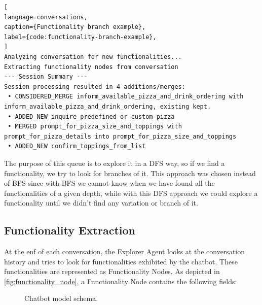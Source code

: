 \begin{itemize}
\begin{lstlisting}[
language=conversations,
caption={Functionality branch example},
label={code:functionality-branch-example},
]
Analyzing conversation for new functionalities...
Extracting functionality nodes from conversation
--- Session Summary ---
Session processing resulted in 4 additions/merges:
 • CONSIDERED_MERGE inform_available_pizza_and_drink_ordering with inform_available_pizza_and_drink_ordering, existing kept.
 • ADDED_NEW inquire_predefined_or_custom_pizza
 • MERGED prompt_for_pizza_size_and_toppings with prompt_for_pizza_details into prompt_for_pizza_size_and_toppings
 • ADDED_NEW confirm_toppings_from_list
\end{lstlisting}

\end{itemize}


The purpose of this queue is to explore it in a \ac{DFS} way,
so if we find a functionality, we try to look for branches of it.
This approach was chosen instead of \ac{BFS}
since with \ac{BFS} we cannot know when we have found
all the functionalities of a given depth,
while with this \ac{DFS} approach we could explore a functionality
until we didn't find any variation or branch of it.

\subsection{Functionality Extraction}\label{subsec:functionality_extraction}

At the enf of each conversation,
the Explorer Agent looks at the conversation history
and tries to look for functionalities exhibited by the chatbot.
These functionalities are represented as Functionality Nodes.
As depicted in \autoref{fig:functionality_node},
a Functionality Node contains the following fields:

\begin{figure}[htpb]
  \centering
  
  \caption{
    Chatbot model schema.
  }
  \label{fig:functionality_node}
\end{figure}

